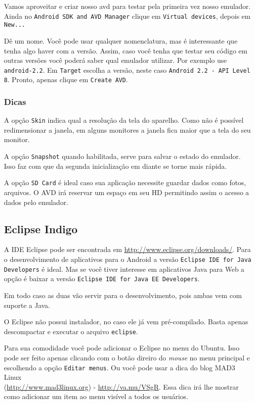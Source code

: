 Vamos aproveitar e criar nosso \gls{avd} para testar pela primeira vez nosso emulador. Ainda no
\texttt{Android SDK and AVD Manager} clique em \texttt{Virtual devices}, depois em \texttt{New...}

Dê um nome. Você pode usar qualquer nomenclatura, mas é interessante que tenha algo haver com a versão. Assim,
caso você tenha que testar seu código em outras versões você poderá saber qual emulador utilizar. Por
exemplo use \texttt{android-2.2}. Em \texttt{Target} escolha a versão, neste caso
\texttt{Android 2.2 - API Level 8}. Pronto, apenas clique em \texttt{Create AVD}.

\subsubsection{Dicas}

A opção \texttt{Skin} indica qual a resolução da tela do aparelho. Como não é possível
redimensionar a janela, em alguns monitores a janela fica maior que a tela do seu monitor.

A opção \texttt{Snapshot} quando habilitada, serve para salvar o estado do emulador. Isso faz
com que da segunda inicialização em diante se torne mais rápida.

A opção \texttt{SD Card} é ideal caso sua aplicação necessite guardar dados como fotos, arquivos.
O AVD irá reservar um espaço em seu HD permitindo assim o acesso a dados pelo emulador.

\subsection{Eclipse Indigo}

A IDE Eclipse pode ser encontrada em \url{http://www.eclipse.org/downloads/}. Para o desenvolvimento
de aplicativos para o Android a versão \texttt{Eclipse IDE for Java Developers} é ideal. Mas se você
tiver interesse em aplicativos Java para Web a opção é baixar a versão \texttt{Eclipse IDE for Java EE Developers}.

Em todo caso as duas vão servir para o desenvolvimento, pois ambas vem com suporte a Java.

O Eclipse não possui instalador, no caso ele já vem pré-compilado. Basta apenas descompactar e executar
o arquivo \texttt{eclipse}.

Para sua comodidade você pode adicionar o Eclipse no menu do Ubuntu. Isso pode ser feito apenas clicando
com o botão direiro do \textit{mouse} no menu principal e escolhendo a opção \texttt{Editar menus}. Ou você pode
usar a dica do blog MAD3 Linux \\ (\url{http://www.mad3linux.org}) - \url{http://va.mu/VSgR}. Essa dica irá
lhe mostrar como adicionar um item ao menu visível a todos os usuários.


